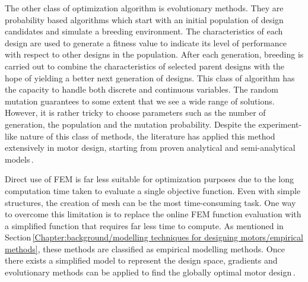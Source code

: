         
        The other class of optimization algorithm is evolutionary methods. They are probability based algorithms which start with an initial population of design candidates and simulate a breeding environment. The characteristics of each design are used to generate a fitness value to indicate its level of performance with respect to other designs in the population. After each generation, breeding is carried out to combine the characteristics of selected parent designs with the hope of yielding a better next generation of designs. This class of algorithm has the capacity to handle both discrete and continuous variables. The random mutation guarantees to some extent that we see a wide range of solutions. However, it is rather tricky to choose parameters such as the number of generation, the population and the mutation probability. Despite the experiment-like nature of this class of methods, the literature has applied this method extensively in motor design, starting from proven analytical and semi-analytical models\,\cite{Isfahani2007,Li2014DesignAlgorithm,Mallik2017EfficiencyAlgorithm,RuiHuang2008MinimizationArray}.
        
        
        Direct use of \acs{FEM} is far less suitable for optimization purposes due to the long computation time taken to evaluate a single objective function. Even with simple structures, the creation of mesh can be the most time-consuming task. One way to overcome this limitation is to replace the online \acs{FEM} function evaluation with a simplified function that requires far less time to compute. As mentioned in Section\,\ref{Chapter:background/modelling techniques for designing motors/empirical methods}, these methods are classified as empirical modelling methods. Once there exists a simplified model to represent the design space, gradients and evolutionary methods can be applied to find the globally optimal motor design\,\cite{Ashabani2010OptimumApproach,Lee2012OptimumMethod,Giurgea2007,Hasanien2010, Hasanien2011,Zhang2017}. 
